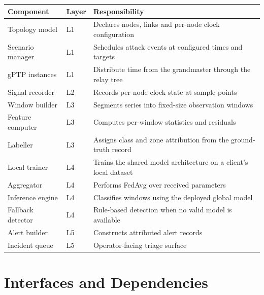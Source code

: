 \begin{longtable}{p{} p{} p{}}
\toprule
\textbf{Component} & \textbf{Layer} & \textbf{Responsibility} \\
\midrule
\endhead
Topology model & L1 & Declares nodes, links and per-node clock configuration \\
Scenario manager & L1 & Schedules attack events at configured times and targets \\
gPTP instances & L1 & Distribute time from the grandmaster through the relay tree \\
Signal recorder & L2 & Records per-node clock state at sample points \\
Window builder & L3 & Segments series into fixed-size observation windows \\
Feature computer & L3 & Computes per-window statistics and residuals \\
Labeller & L3 & Assigns class and zone attribution from the ground-truth record \\
Local trainer & L4 & Trains the shared model architecture on a client's local dataset \\
Aggregator & L4 & Performs FedAvg over received parameters \\
Inference engine & L4 & Classifies windows using the deployed global model \\
Fallback detector & L4 & Rule-based detection when no valid model is available \\
Alert builder & L5 & Constructs attributed alert records \\
Incident queue & L5 & Operator-facing triage surface \\
\bottomrule
\end{longtable}

\section{Interfaces and Dependencies}
\label{sec:interfaces}

